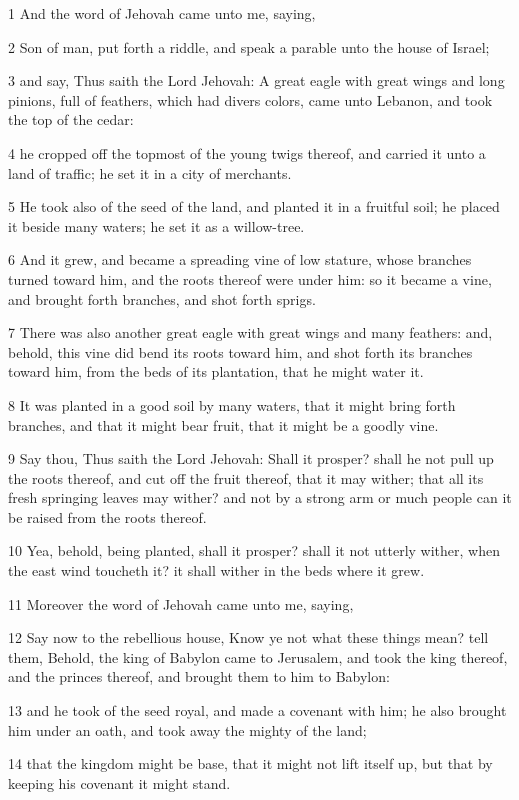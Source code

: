 \par 1 And the word of Jehovah came unto me, saying,
\par 2 Son of man, put forth a riddle, and speak a parable unto the house of Israel;
\par 3 and say, Thus saith the Lord Jehovah: A great eagle with great wings and long pinions, full of feathers, which had divers colors, came unto Lebanon, and took the top of the cedar:
\par 4 he cropped off the topmost of the young twigs thereof, and carried it unto a land of traffic; he set it in a city of merchants.
\par 5 He took also of the seed of the land, and planted it in a fruitful soil; he placed it beside many waters; he set it as a willow-tree.
\par 6 And it grew, and became a spreading vine of low stature, whose branches turned toward him, and the roots thereof were under him: so it became a vine, and brought forth branches, and shot forth sprigs.
\par 7 There was also another great eagle with great wings and many feathers: and, behold, this vine did bend its roots toward him, and shot forth its branches toward him, from the beds of its plantation, that he might water it.
\par 8 It was planted in a good soil by many waters, that it might bring forth branches, and that it might bear fruit, that it might be a goodly vine.
\par 9 Say thou, Thus saith the Lord Jehovah: Shall it prosper? shall he not pull up the roots thereof, and cut off the fruit thereof, that it may wither; that all its fresh springing leaves may wither? and not by a strong arm or much people can it be raised from the roots thereof.
\par 10 Yea, behold, being planted, shall it prosper? shall it not utterly wither, when the east wind toucheth it? it shall wither in the beds where it grew.
\par 11 Moreover the word of Jehovah came unto me, saying,
\par 12 Say now to the rebellious house, Know ye not what these things mean? tell them, Behold, the king of Babylon came to Jerusalem, and took the king thereof, and the princes thereof, and brought them to him to Babylon:
\par 13 and he took of the seed royal, and made a covenant with him; he also brought him under an oath, and took away the mighty of the land;
\par 14 that the kingdom might be base, that it might not lift itself up, but that by keeping his covenant it might stand.
